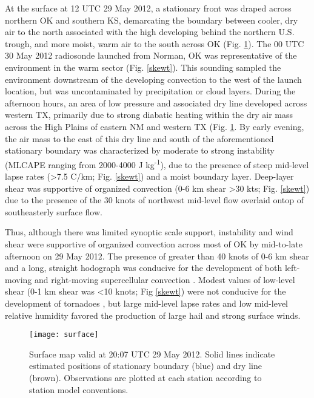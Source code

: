 At the surface at 12 UTC 29 May 2012, a stationary front was draped across northern OK and southern KS, demarcating the boundary between cooler, dry air to the north associated with the high developing behind the northern U.S. trough, and more moist, warm air to the south across OK (Fig. \ref{surface}).  The 00 UTC 30 May 2012 radiosonde launched from Norman, OK was representative of the environment in the warm sector (Fig. \ref{skewt}). This sounding sampled the environment downstream of the developing convection to the west of the launch location, but was uncontaminated by precipitation or cloud layers. During the afternoon hours, an area of low pressure and associated dry line developed across western TX, primarily due to strong diabatic heating within the dry air mass across the High Plains of eastern NM and western TX (Fig. \ref{surface}. By early evening, the air mass to the east of this dry line and south of the aforementioned stationary boundary was characterized by moderate to strong instability (MLCAPE ranging from 2000-4000 J kg\textsuperscript{-1}), due to the presence of steep mid-level lapse rates (\textgreater 7.5 C/km; Fig. \ref{skewt}) and a moist boundary layer. Deep-layer shear was supportive of organized convection (0-6 km shear \textgreater 30 kts; Fig. \ref{skewt}) due to the presence of the 30 knots of northwest mid-level flow overlaid ontop of southeasterly surface flow.

Thus, although there was limited synoptic scale support, instability and wind shear were supportive of organized convection across most of OK by mid-to-late afternoon on 29 May 2012.  The presence of greater than 40 knots of 0-6 km shear and a long, straight hodograph was conducive for the development of both left-moving and right-moving supercellular convection \citep{klempwilhelmson78}. Modest values of low-level shear (0-1 km shear was \textless 10 knots; Fig \ref{skewt}) were not conducive for the development of tornadoes \citep{thompsonetal03}, but large mid-level lapse rates and low mid-level relative humidity favored the production of large hail and strong surface winds.

\begin{figure}
\centering
\texttt{[image: surface]}
\caption{Surface map valid at 20:07 UTC 29 May 2012. Solid lines indicate estimated positions of stationary boundary (blue) and dry line (brown). Observations are plotted at each station according to station model conventions.}
\label{surface}
\end{figure}


